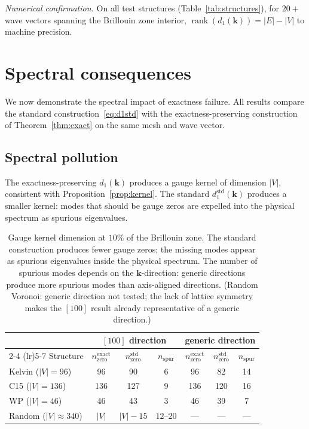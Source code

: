 \documentclass[preprint,12pt]{elsarticle}
\begin{document}
\emph{Numerical confirmation.} On all test structures (Table~\ref{tab:structures}), for $20{+}$ wave vectors spanning the Brillouin zone interior, $\operatorname{rank}(d_1(\mathbf{k})) = |E| - |V|$ to machine precision.

\section{Spectral consequences}
\label{sec:consequences}

We now demonstrate the spectral impact of exactness failure. All results compare the standard construction~\eqref{eq:d1std} with the exactness-preserving construction of Theorem~\ref{thm:exact} on the same mesh and wave vector.

\subsection{Spectral pollution}
\label{sec:pollution}

The exactness-preserving $d_1(\mathbf{k})$ produces a gauge kernel of dimension $|V|$, consistent with Proposition~\ref{prop:kernel}. The standard $d_1^{\mathrm{std}}(\mathbf{k})$ produces a smaller kernel: modes that should be gauge zeros are expelled into the physical spectrum as spurious eigenvalues.

\begin{table}[h]
\centering
\begin{tabular}{lcccccc}
\toprule
& \multicolumn{3}{c}{$[100]$ direction} & \multicolumn{3}{c}{generic direction} \\
\cmidrule(lr){2-4} \cmidrule(lr){5-7}
Structure & $n_{\mathrm{zero}}^{\mathrm{exact}}$ & $n_{\mathrm{zero}}^{\mathrm{std}}$ & $n_{\mathrm{spur}}$ & $n_{\mathrm{zero}}^{\mathrm{exact}}$ & $n_{\mathrm{zero}}^{\mathrm{std}}$ & $n_{\mathrm{spur}}$ \\
\midrule
Kelvin ($|V|{=}96$)  & 96  & 90  & 6  & 96  & 82  & 14 \\
C15 ($|V|{=}136$)    & 136 & 127 & 9  & 136 & 120 & 16 \\
WP ($|V|{=}46$)      & 46  & 43  & 3  & 46  & 39  & 7  \\
Random ($|V|{\approx}340$) & $|V|$ & $|V|{-}15$ & $12$--$20$ & --- & --- & --- \\
\bottomrule
\end{tabular}
\caption{Gauge kernel dimension at $10\%$ of the Brillouin zone. The standard construction produces fewer gauge zeros; the missing modes appear as spurious eigenvalues inside the physical spectrum. The number of spurious modes depends on the $\mathbf{k}$-direction: generic directions produce more spurious modes than axis-aligned directions. (Random Voronoi: generic direction not tested; the lack of lattice symmetry makes the $[100]$ result already representative of a generic direction.)}
\label{tab:pollution}
\end{table}
\end{document}
